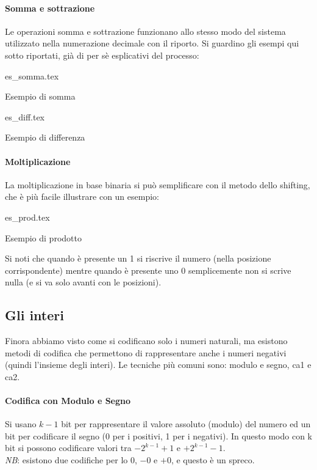 \documentclass[class=book, crop=false, oneside]{standalone}
\begin{document}
\paragraph*{Somma e sottrazione}
Le operazioni somma e sottrazione funzionano allo stesso modo del sistema utilizzato nella numerazione decimale con il riporto. Si guardino gli esempi qui sotto riportati, già di per sè esplicativi del processo:
\vspace{10px}

\begin{table}[h!]
	\centering
	{es_somma.tex}
	\caption{Esempio di somma}
\end{table}
\begin{table}[h!]
	\centering
	{es_diff.tex}
	\caption{Esempio di differenza}
\end{table}

\paragraph*{Moltiplicazione}
La moltiplicazione in base binaria si può semplificare con il metodo dello shifting, che è più facile illustrare con un esempio:
\begin{table}[H]
	\centering
	{es_prod.tex}
	\caption{Esempio di prodotto}
\end{table}
Si noti che quando è presente un 1 si riscrive il numero (nella posizione corrispondente) mentre  quando è presente uno 0 semplicemente non si scrive nulla (e si va solo avanti con le posizioni).

\subsection{Gli interi}
Finora abbiamo visto come si codificano solo i numeri naturali, ma esistono metodi di codifica che permettono di rappresentare anche i numeri negativi (quindi l’insieme degli interi). Le tecniche più comuni sono: modulo e segno, \acrfull{ca1} e \acrfull{ca2}.

\paragraph*{Codifica con Modulo e Segno}
Si usano \(k-1\) bit per rappresentare il valore assoluto (modulo) del numero  ed un bit per codificare il segno (0 per i positivi, 1 per i negativi). In questo modo con k bit si possono codificare valori tra \(-2^{k-1}+1\) e \(+2^{k-1}-1\).\\
\emph{NB}: esistono due codifiche per lo \(0\), \(-0\) e \(+0\), e questo è un spreco.
\end{document}

